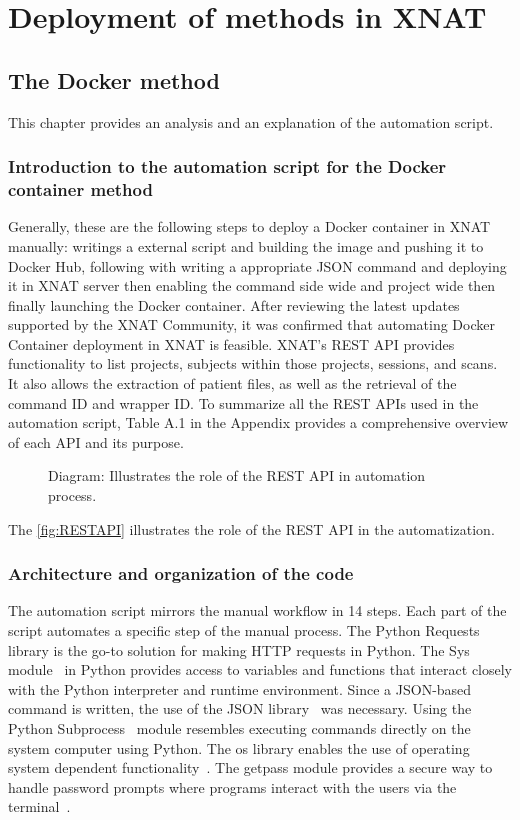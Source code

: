 \chapter{Deployment of methods in XNAT}
\section{The Docker method}
This chapter provides an analysis and an explanation of the automation script.

\subsection{Introduction to the automation script for the Docker container method}
Generally, these are the following steps to deploy a Docker container in XNAT manually: writings a external script and building the image and pushing it to Docker Hub, following with writing a appropriate JSON command and deploying it in XNAT server then enabling the command side wide and project wide then finally launching the Docker container. 
After reviewing the latest updates supported by the XNAT Community, it was confirmed that automating Docker Container deployment in XNAT is feasible.
XNAT's REST API provides functionality to list projects, subjects within those projects, sessions, and scans. It also allows the extraction of patient files, as well as the retrieval of the command \ac{ID} and wrapper \ac{ID}.
To summarize all the REST APIs used in the automation script, Table A.1 in the Appendix provides a comprehensive overview of each API and its purpose.

\begin{figure}[H]
    \centering
    \def\svgwidth{0.4\linewidth}
    
    \caption{ Diagram: Illustrates the role of the REST API in automation process.}
    \label{fig:RESTAPI}
\end{figure}


The \autoref{fig:RESTAPI} illustrates the role of the REST API in the automatization.



\subsection{Architecture and organization of the code}
The automation script mirrors the manual workflow in 14 steps. Each part of the script automates a specific step of the manual process.  
The Python Requests~\cite{request} library is the go-to solution for making \ac{HTTP} requests in Python. The Sys module~\cite{sys} in Python provides access to variables and functions that interact closely with the Python interpreter and runtime environment.
Since a JSON-based command is written, the use of the JSON library~\cite{pythonjson} was necessary. Using the Python Subprocess~\cite{subprocess} module resembles executing commands directly on the system computer using Python. The os library enables the use of operating system dependent functionality~\cite{os}.   
The getpass module provides a secure way to handle password prompts where programs interact with the users via the terminal~\cite{getpass}. 

